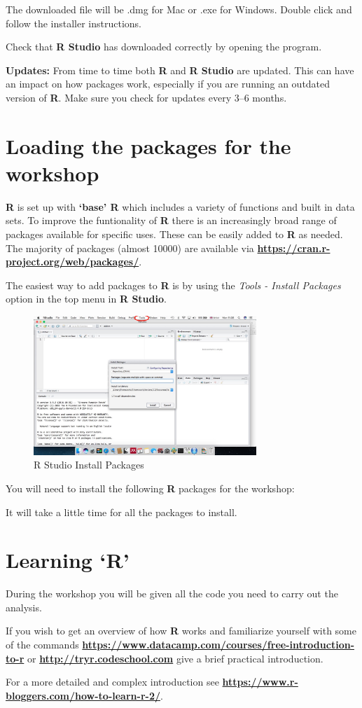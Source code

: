 \documentclass[12pt]{article}
\begin{document}
The downloaded file will be .dmg for Mac or .exe for Windows. Double click and follow the installer instructions.

Check that \textbf{R Studio} has downloaded correctly by opening the program.

\textbf{Updates:} From time to time both \textbf{R} and \textbf{R Studio} are updated. This can have an impact on how packages work, especially if you are running an outdated version of \textbf{R}. Make sure you check for updates every 3--6 months.

\section{Loading the packages for the workshop}
\textbf{R} is set up with \textbf{`base' R} which includes a variety of functions and built in data sets. To improve the funtionality of \textbf{R} there is an increasingly broad range of packages available for specific uses. These can be easily added to \textbf{R} as needed. The majority of packages (almost 10000) are available via \textbf{\url{https://cran.r-project.org/web/packages/}}.

The easiest way to add packages to \textbf{R} is by using the \textit{Tools - Install Packages} option in the top menu in \textbf{R Studio}.

\begin{figure}[h]
	\centering
	\includegraphics[width=0.75\textwidth]{installPkg.jpg}
	\caption{R Studio Install Packages}
\end{figure}

You will need to install the following \textbf{R} packages for the workshop:

It will take a little time for all the packages to install.

\section{Learning `R'}
During the workshop you will be given all the code you need to carry out the analysis. 

If you wish to get an overview of how \textbf{R} works and familiarize yourself with some of the commands \textbf{\url{https://www.datacamp.com/courses/free-introduction-to-r}} or \textbf{\url{http://tryr.codeschool.com}} give a brief practical introduction.

For a more detailed and complex introduction see \textbf{\url{https://www.r-bloggers.com/how-to-learn-r-2/}}.
 
\end{document}
